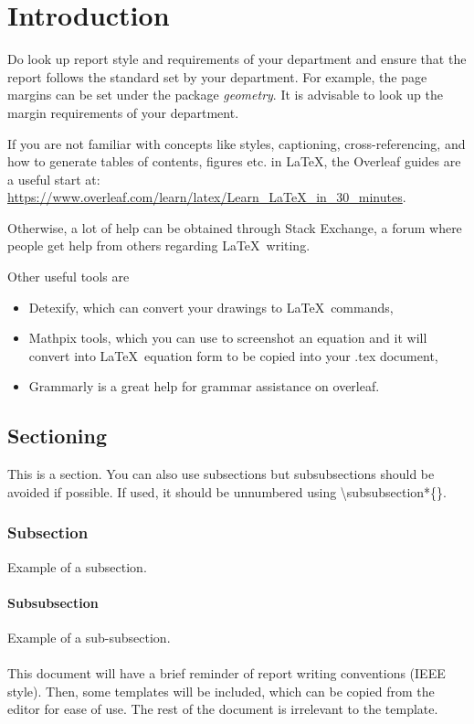 \chapter{Introduction}
Do look up report style and requirements of your department and ensure that the report follows the standard set by your department. For example, the page margins can be set under the package \textit{geometry}. It is advisable to look up the margin requirements of your department. 

If you are not familiar with concepts like styles, captioning, cross-referencing, and how to generate tables of contents, figures etc. in LaTeX, the Overleaf guides are a useful start at: \url{https://www.overleaf.com/learn/latex/Learn_LaTeX_in_30_minutes}. 

Otherwise, a lot of help can be obtained through Stack Exchange, a forum where people get help from others regarding \LaTeX\ writing. 

Other useful tools are
\begin{itemize}
    \item Detexify, which can convert your drawings to \LaTeX\ commands, 
    \item Mathpix tools, which you can use to screenshot an equation and it will convert into \LaTeX\ equation form to be copied into your .tex document,
    \item Grammarly is a great help for grammar assistance on overleaf. 
\end{itemize}

\section{Sectioning}
This is a section. You can also use subsections but subsubsections should be avoided if possible. If used, it should be unnumbered using \textbackslash subsubsection*\{\}. 
\subsection{Subsection}
Example of a subsection. 

\subsubsection*{Subsubsection}
Example of a sub-subsection. \\
\\This document will have a brief reminder of report writing conventions (IEEE style). Then, some templates will be included, which can be copied from the editor for ease of use. The rest of the document is irrelevant to the template. 